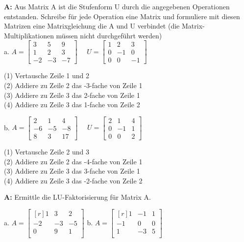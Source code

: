 \documentclass[landscape,twocolumn,a4paper]{article}
\begin{document}
\bigskip {}

\newpage
\textbf{A:}   
Aus Matrix A ist die Stufenform U durch die angegebenen Operationen entstanden. 
Schreibe für jede Operation eine Matrix und formuliere mit diesen Matrizen eine Matrixgleichung die A und U verbindet (die Matrix-Multiplikationen müssen nicht durchgeführt werden) \\
 
a.
 $A = \left[\begin{array}{rrr}
3 & 5 & 9 \\
1 & 2 & 3 \\
-2 & -3 & -7
\end{array}\right] \quad  $  
$U = \left[\begin{array}{rrr}
1 & 2 & 3 \\
0 & -1 & 0 \\
0 & 0 & -1
\end{array}\right]  \quad$
 
 (1) Vertausche Zeile 1 und 2 \\
 (2) Addiere zu Zeile 2 das -3-fache von Zeile 1\\
 (3)  Addiere zu Zeile 3 das 2-fache von Zeile 1 \\
 (4)  Addiere zu Zeile 3 das 1-fache von Zeile 2 
 \vspace{10pt}
 
b.
 $A = \left[\begin{array}{rrr}
2 & 1 & 4 \\
-6 & -5 & -8 \\
8 & 3 & 17
\end{array}\right] \quad  $  
$U = \left[\begin{array}{rrr}
2 & 1 & 4 \\
0 & -1 & 1 \\
0 & 0 & 2
\end{array}\right]  \quad$

 (1) Vertausche Zeile 2 und 3 \\
 (2)  Addiere zu Zeile 2 das -4-fache von Zeile 1 \\
 (3) Addiere zu Zeile 3 das 3-fache von Zeile 1  \\
 (4) Addiere zu Zeile 3 das -2-fache von Zeile 2
 \vspace{10pt}

\bigskip {}

\textbf{A:}   
Ermittle die LU-Faktorisierung für Matrix A.

a.  $A =\begin{bmatrix*}[r] 1 & 3 & 2\\  -2 & -3 & -5\\ 0 & 9 & 1\\ \end{bmatrix*}$  \quad 
b.  $A =\begin{bmatrix*}[r] 1 & -1 & 1\\  -1 & 0 & 0\\ 1 &-3 & 5\\ \end{bmatrix*}$  \quad 
\end{document}
